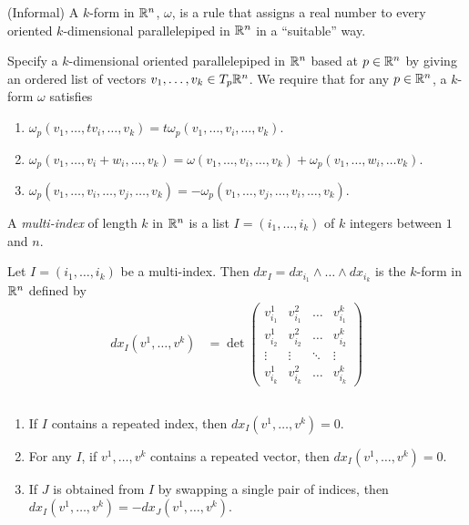 \documentclass[11pt]{article}
\begin{document}
\begin{definition} (Informal) A $k$-form in $\mathbb{R}^n$, $\omega$, is a rule that assigns a real number to every oriented $k$-dimensional parallelepiped in $\mathbb{R}^n$ in a ``suitable'' way.
\end{definition}

Specify a $k$-dimensional oriented parallelepiped in $\mathbb{R}^n$ based at $p \in \mathbb{R}^n$ by giving an ordered list of vectors $v_1, \dots, v_k \in T_p\mathbb{R}^n$. We require that for any $p \in \mathbb{R}^n$, a $k$-form $\omega$ satisfies
\begin{enumerate}
\item $\omega_p(v_1, \dots, tv_i, \dots,  v_k) = t \omega_p (v_1, \dots, v_i, \dots,  v_k)$.
\item $\omega_p(v_1, \dots, v_i + w_i, \dots, v_k) = \omega(v_1, \dots, v_i, \dots, v_k) + \omega_p (v_1, \dots, w_i, \dots v_k)$.
\item $\omega_p(v_1, \dots, v_i, \dots, v_j, \dots, v_k) = - \omega_p(v_1, \dots, v_j, \dots, v_i, \dots, v_k)$.
\end{enumerate}

\begin{definition} A \emph{multi-index} of length $k$ in $\mathbb{R}^n$ is a list $I = (i_1, \dots, i_k)$ of $k$ integers between $1$ and $n$.
\end{definition}

\begin{definition} Let $I = (i_1, \dots, i_k)$ be a multi-index. Then $dx_I = dx_{i_1} \wedge \dots \wedge dx_{i_k}$ is the $k$-form in $\mathbb{R}^n$ defined by \begin{align*} dx_I (v^1 , \dots, v^k) & = \det \begin{pmatrix} v_{i_1}^1 & v_{i_1}^2 & \hdots & v_{i_1}^k \\ v_{i_2}^1 & v_{i_2}^2 & \hdots & v_{i_2}^k \\ \vdots & \vdots & \ddots & \vdots \\ v_{i_k}^1 & v_{i_k}^2 & \hdots & v_{i_k}^k \end{pmatrix} \end{align*}
\end{definition}

\begin{remark} $\text{}$
  \begin{enumerate}
  \item If $I$ contains a repeated index, then $dx_I (v^1, \dots, v^k) = 0$.
  \item For any $I$, if $v^1, \dots, v^k$ contains a repeated vector, then $dx_I (v^1, \dots, v^k) = 0$. 
  \item If $J$ is obtained from $I$ by swapping a single pair of indices, then $dx_I (v^1, \dots, v^k) = - dx_J (v^1, \dots, v^k)$.
  \end{enumerate}
\end{remark}
\end{document}
